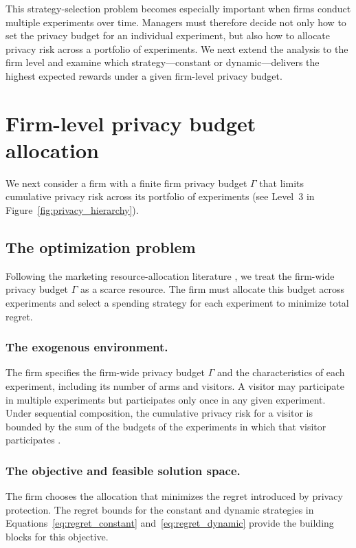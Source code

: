 \documentclass[mksc,nonblindrev]{informs3}
\begin{document}
This strategy-selection problem becomes especially important when firms conduct multiple experiments over time. Managers must therefore decide not only how to set the privacy budget for an individual experiment, but also how to allocate privacy risk across a portfolio of experiments. We next extend the analysis to the firm level and examine which strategy---constant or dynamic---delivers the highest expected rewards under a given firm-level privacy budget.


\section{Firm-level privacy budget allocation}\label{sec:multi_exp_portfolio}
We next consider a firm with a finite firm privacy budget $\Gamma$ that limits cumulative privacy risk across its portfolio of experiments (see Level~3 in Figure~\ref{fig:privacy_hierarchy}).

\subsection{The optimization problem}
Following the marketing resource-allocation literature
\citep{Fischer_2011, Peers_2017, ZiaRao2019}, we treat the firm-wide privacy budget $\Gamma$ as a scarce resource. The firm must allocate this budget across experiments and select a spending strategy for each experiment to minimize total regret.

\subsubsection{The exogenous environment.}
The firm specifies the firm-wide privacy budget $\Gamma$ and the characteristics of each experiment, including its number of arms and visitors. A visitor may participate in multiple experiments but participates only once in any given experiment. Under sequential composition, the cumulative privacy risk for a visitor is bounded by the sum of the budgets of the experiments in which that visitor participates \citep[see Theorem~3.14 in][]{Dwork_2014}. 

\subsubsection{The objective and feasible solution space.}The firm chooses the allocation that minimizes the regret introduced by privacy protection. The regret bounds for the constant and dynamic strategies in Equations~\eqref{eq:regret_constant} and~\eqref{eq:regret_dynamic} provide the building blocks for this objective. 
\end{document}
